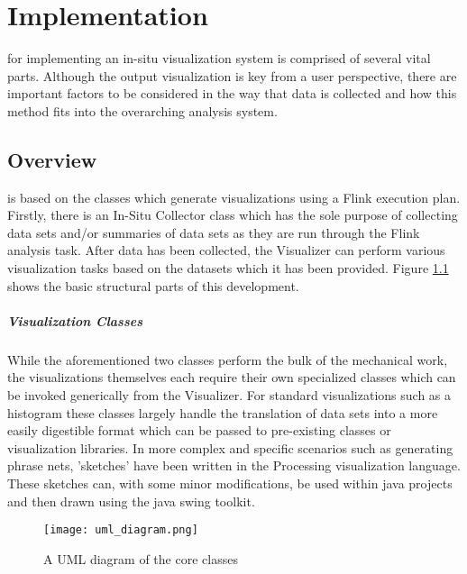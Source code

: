 \chapter{Implementation}
\label{sec:implementation}
 for implementing an in-situ visualization system is comprised of several vital parts. Although the  output visualization is key from a user perspective, there are important factors to be considered in the way that data is collected and how this method fits into the overarching analysis system. 
 
\section{Overview}
\label{sec:overview}
 is based on the classes which generate visualizations using a Flink execution plan. Firstly, there is an In-Situ Collector class which has the sole purpose of collecting data sets and/or summaries of data sets as they are run through the Flink analysis task. After data has been collected, the Visualizer can perform various visualization tasks based on the datasets which it has been provided. Figure \ref{fig:uml} shows the basic structural parts of this development. 

\paragraph{Visualization Classes}
While the aforementioned two classes perform the  bulk of the mechanical work, the visualizations themselves each require their own specialized classes which can be invoked generically from the Visualizer. For standard visualizations such as a histogram these classes largely handle the translation of data sets into a more easily digestible format which can be passed to pre-existing classes or visualization libraries. In more complex and specific scenarios such as generating phrase nets, 'sketches' have been written in the Processing visualization language. These sketches can, with some minor modifications, be used within java projects and then drawn using the java swing toolkit. 

\begin{figure}
	\centering
	\label{fig:uml}
	\texttt{[image: uml\_diagram.png]}
	\caption{A UML diagram of the core classes}
\end{figure}

